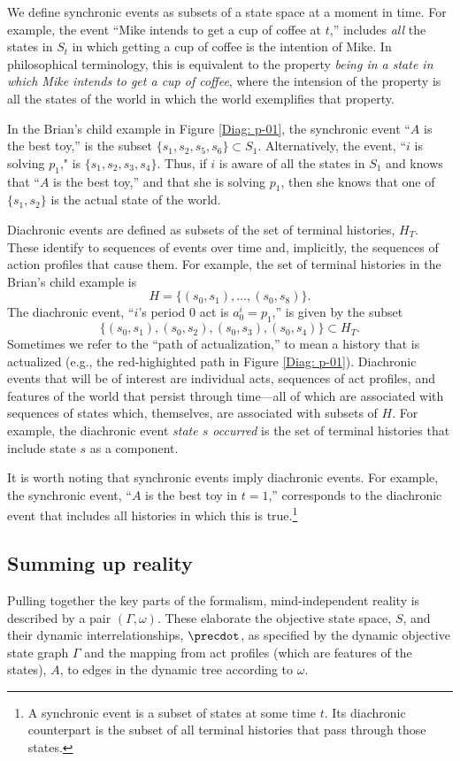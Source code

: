 \documentclass[
11pt,
titlepage,
reqno,
]{article}%
\theoremstyle{definition}
\begin{document}
We define synchronic events as subsets of a state space at a moment in time. 
For example, the event ``Mike intends to get a cup of coffee at $t$,'' includes \textit{all} the states in $S_t$ in which getting a cup of coffee is the intention of Mike. 
In philosophical terminology, this is equivalent to the property \textit{being in a state in which Mike intends to get a cup of coffee}, where the intension of the property is all the states of the world in which the world exemplifies that property.

In the Brian's child example in Figure \ref{Diag: p-01}, the synchronic event ``$A$ is the best toy,'' is the subset $\{s_{1},s_{2},s_{5},s_{6}\}\subset S_1$.
Alternatively, the event, ``$i$ is solving $p_1$," is $\{s_{1},s_{2},s_{3},s_{4}\}$.
Thus, if $i$ is aware of all the states in $S_1$ and knows that ``$A$ is the best toy,'' and that she is solving $p_1$, then she knows that one of $\{s_{1},s_{2}\}$ is the actual state of the world.

Diachronic events are defined as subsets of the set of terminal histories, $H_T$.
These identify to sequences of events over time and, implicitly, the sequences of action profiles that cause them.
For example, the set of terminal histories in the Brian's child example is
\[
	H=\{(s_0,s_{1}),\ldots,(s_0,s_{8})\}.
\]
The diachronic event, ``$i$'s period 0 act is $a^i_0=p_1$,'' is given by the subset
\[
	\{(s_0,s_{1}),(s_0,s_{2}),(s_0,s_{3}),(s_0,s_{4})\}\subset H_T.
\] 
Sometimes we refer to the ``path of actualization,'' to mean a history that is actualized (e.g., the red-highighted path in Figure \ref{Diag: p-01}).
Diachronic events that will be of interest are individual acts, sequences of act profiles, and features of the world that persist through time---all of which are associated with sequences of states which, themselves, are associated with subsets of $H$.
For example, the diachronic event \textit{state $s$ occurred} is the set of terminal histories that include state $s$ as a component.

It is worth noting that synchronic events imply diachronic events.
For example, the synchronic event, ``$A$ is the best toy in $t=1$,'' corresponds to the diachronic event that includes all histories in which this is true.\footnote
{
	A synchronic event is a subset of states at some time $t$. Its diachronic counterpart is the subset of all terminal histories that pass through those states.
}

\subsection{Summing up reality}
Pulling together the key parts of the formalism, mind-independent reality is described by a pair $(\Gamma,\omega)$.
These elaborate the objective state space, $S$, and their dynamic interrelationships, $\precdot$, as specified by the dynamic objective state graph $\Gamma$  and the mapping from act profiles (which are features of the states), $A$, to edges in the dynamic tree according to $\omega$.
  
\end{document}
